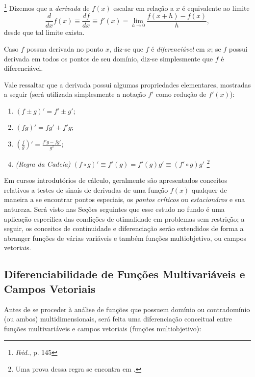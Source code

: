 \begin{definition}\footnote{\textit{Ibid.}, p. 145}
Dizemos que a \textit{derivada} de $f(x)$ escalar em rela\c{c}\~{a}o a $x$ \'{e} equivalente ao limite
\begin{equation}
\frac{d}{dx}f(x) \equiv \frac{df}{dx} \equiv f'(x) = \lim_{h \to 0} \frac{f(x+h)-f(x)}{h},
\end{equation}
desde que tal limite exista.
\end{definition}

Caso $f$ possua derivada no ponto $x$, diz-se que $f$ \'{e} \textit{diferenci\'{a}vel} em $x$; se $f$ possui derivada em todos os pontos de seu dom\'{i}nio, diz-se simplesmente que $f$ \'{e} diferenci\'{a}vel.

Vale ressaltar que a derivada possui algumas propriedades elementares, mostradas a seguir (ser\'{a} utilizada simplesmente a nota\c{c}\~{a}o $f'$ como redu\c{c}\~{a}o de $f'(x)$):
\begin{enumerate}[label=(\alph*)]
\item $(f \pm g)' = f' \pm g'$;
\item $(fg)' = fg' + f'g$;
\item $\left(\frac{f}{g}\right)' = \frac{f'g - fg'}{g^2}$;
\item \textit{(Regra da Cadeia)} $(f \circ g)' \equiv f'(g) = f'(g)g' \equiv (f' \circ g)g'$ \footnote{Uma prova dessa regra se encontra em \cite[p. 246]{thomas1}.}
\end{enumerate}

Em cursos introdut\'{o}rios de c\'{a}lculo, geralmente s\~{a}o apresentados conceitos relativos a testes de sinais de derivadas de uma fun\c{c}\~{a}o $f(x)$ qualquer de maneira a se encontrar pontos especiais, os \textit{pontos cr\'{i}ticos} ou \textit{estacion\'{a}ros} e sua natureza. Ser\'{a} visto nas Se\c{c}\~{o}es seguintes que esse estudo no fundo \'{e} uma aplica\c{c}\~{a}o espec\'{i}fica das condi\c{c}\~{o}es de otimalidade em problemas sem restri\c{c}\~{a}o; a seguir, os conceitos de continuidade e diferencia\c{c}\~{a}o ser\~{a}o extendidos de forma a abranger fun\c{c}\~{o}es de v\'{a}rias vari\'{a}veis e tamb\'{e}m fun\c{c}\~{o}es multiobjetivo, ou campos vetoriais.

\subsection{Diferenciabilidade de Fun\c{c}\~{o}es Multivari\'{a}veis e Campos Vetoriais}

Antes de se proceder \`{a} an\'{a}lise de fun\c{c}\~{o}es que possuem dom\'{i}nio ou contradom\'{i}nio (ou ambos) multidimensionais, ser\'{a} feita uma diferencia\c{c}\~{a}o conceitual entre fun\c{c}\~{o}es multivari\'{a}veis e campos vetoriais (fun\c{c}\~{o}es multiobjetivo):

